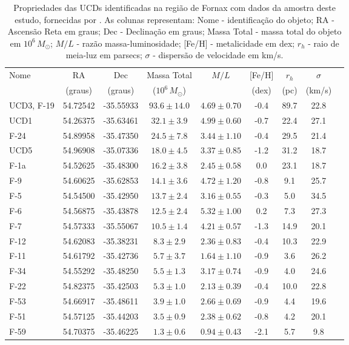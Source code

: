 \begin{table}[!ht]
    \centering
    \caption{Propriedades das UCDs identificadas na região de Fornax com dados da amostra deste estudo, fornecidas por \citealt{Mieske_2008_2}. As colunas representam: Nome - identificação do objeto; RA - Ascensão Reta em graus; Dec - Declinação em graus; Massa Total - massa total do objeto em $10^6 \, M_\odot$; $M/L$ - razão massa-luminosidade; [Fe/H] - metalicidade em dex; $r_h$ - raio de meia-luz em parsecs; $\sigma$ - dispersão de velocidade em km/s.}
    \begin{tabular}{lcccccccc}
        \toprule
        Nome & RA & Dec & Massa Total & $M/L$ & [Fe/H] & $r_h$ & $\sigma$ \\
        & (graus) & (graus) & ($10^6 \, M_\odot$) & & (dex) & (pc) & (km/s)\\
        \midrule
        UCD3, F-19 & 54.72542 & -35.55933 & $93.6 \pm 14.0$ & $4.69 \pm 0.70$ & -0.4 & 89.7 & 22.8 \\
        UCD1       & 54.26375 & -35.63461 & $32.1 \pm 3.9$  & $4.99 \pm 0.60$ & -0.7 & 22.4 & 27.1 \\
        F-24       & 54.89958 & -35.47350 & $24.5 \pm 7.8$  & $3.44 \pm 1.10$ & -0.4 & 29.5 & 21.4 \\
        UCD5       & 54.96908 & -35.07336 & $18.0 \pm 4.5$  & $3.37 \pm 0.85$ & -1.2 & 31.2 & 18.7 \\
        F-1a       & 54.52625 & -35.48300 & $16.2 \pm 3.8$  & $2.45 \pm 0.58$ & 0.0  & 23.1 & 18.7 \\
        F-9        & 54.60625 & -35.62853 & $14.1 \pm 3.6$  & $4.72 \pm 1.20$ & -0.8 & 9.1  & 25.7 \\
        F-5        & 54.54500 & -35.42950 & $13.7 \pm 2.4$  & $3.16 \pm 0.55$ & -0.3 & 5.0  & 34.5 \\
        F-6        & 54.56875 & -35.43878 & $12.5 \pm 2.4$  & $5.32 \pm 1.00$ & 0.2  & 7.3  & 27.3 \\
        F-7        & 54.57333 & -35.55067 & $10.5 \pm 1.4$  & $4.21 \pm 0.57$ & -1.3 & 14.9 & 20.1 \\
        F-12       & 54.62083 & -35.38231 & $8.3 \pm 2.9$   & $2.36 \pm 0.83$ & -0.4 & 10.3 & 22.9 \\
        F-11       & 54.61792 & -35.42736 & $5.7 \pm 3.7$   & $1.64 \pm 1.10$ & -0.9 & 3.6  & 26.2 \\
        F-34       & 54.55292 & -35.48250 & $5.5 \pm 1.3$   & $3.17 \pm 0.74$ & -0.9 & 4.0  & 24.6 \\
        F-22       & 54.82375 & -35.42503 & $5.3 \pm 1.0$   & $2.13 \pm 0.39$ & -0.4 & 10.0 & 22.8 \\
        F-53       & 54.66917 & -35.48611 & $3.9 \pm 1.0$   & $2.66 \pm 0.69$ & -0.9 & 4.4  & 19.6 \\
        F-51       & 54.57125 & -35.44203 & $3.5 \pm 0.9$   & $2.38 \pm 0.62$ & -0.8 & 4.2  & 20.1 \\
        F-59       & 54.70375 & -35.46225 & $1.3 \pm 0.6$   & $0.94 \pm 0.43$ & -2.1 & 5.7  & 9.8  \\
        \bottomrule
    \end{tabular}
    \label{ucds_fornax_propriedades}
\end{table}

